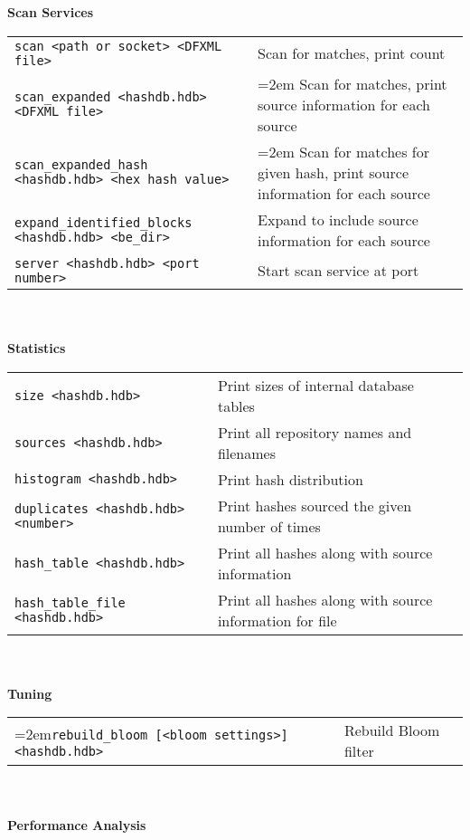 \documentclass[12pt]{article}
\begin{document}
\\
\\
\textbf{Scan Services} \\
\begin{tabular}{p{3.6 in} p{4 in}}
\small\texttt{scan <path or socket> <DFXML file>} & Scan for matches, print count\\
\small\texttt{scan\_expanded <hashdb.hdb> <DFXML file>} & \hangindent=2em Scan for matches, print source information for each source \\
\small\texttt{scan\_expanded\_hash <hashdb.hdb> <hex hash value>} & \hangindent=2em Scan for matches for given hash, print source information for each source \\
\small\texttt{expand\_identified\_blocks <hashdb.hdb> <be\_dir>} & Expand to include source information for each source \\
\texttt{server <hashdb.hdb> <port number>} & Start scan service at port \\
\end{tabular}
\\
\\
\textbf{Statistics}\\
\begin{tabular}{p{3.6 in} l}
\texttt{size <hashdb.hdb>} & Print sizes of internal database tables \\
\texttt{sources <hashdb.hdb>} & Print all repository names and filenames \\
\texttt{histogram <hashdb.hdb>} & Print hash distribution \\
\texttt{duplicates <hashdb.hdb> <number>} & Print hashes sourced the given number of times \\
\texttt{hash\_table <hashdb.hdb>} & Print all hashes along with source information\\
\texttt{hash\_table\_file <hashdb.hdb>} & Print all hashes along with source information for file\\
\end{tabular}
\\
\\
\textbf{Tuning}\\
\begin{tabular}{p{4.0 in} l}
\hangindent=2em\texttt{rebuild\_bloom [<bloom settings>] <hashdb.hdb>} & Rebuild Bloom filter \\
\end{tabular}
\\
\\
\textbf{Performance Analysis}\\
\end{document}

